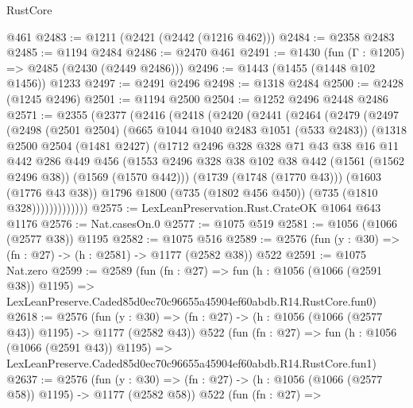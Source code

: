 \begin{lexlean}{RustCore}
\begin{coremodule}
    @461
@2483 := @1211 (@2421 (@2442 (@1216 @462)))
@2484 := @2358 @2483
@2485 := @1194 @2484
@2486 := @2470 @461
@2491 := @1430 (fun (Γ : @1205) => @2485 (@2430 (@2449 @2486)))
@2496 := @1443 (@1455 (@1448 @102 @1456)) @1233
@2497 := @2491 @2496
@2498 := @1318 @2484
@2500 := @2428 (@1245 @2496)
@2501 := @1194 @2500
@2504 := @1252 @2496 @2448 @2486
@2571 := @2355
    (@2377
      (@2416
        (@2418
          (@2420
            (@2441
              (@2464
                (@2479
                  (@2497
                    (@2498
                      (@2501 @2504)
                      (@665 @1044 @1040 @2483 @1051 (@533 @2483))
                      (@1318
                        @2500
                        @2504
                        (@1481 @2427)
                        (@1712
                          @2496
                          @328
                          @328
                          @71
                          @43
                          @38
                          @16
                          @11
                          @442
                          @286
                          @449
                          @456
                          (@1553
                            @2496
                            @328
                            @38
                            @102
                            @38
                            @442
                            (@1561 (@1562 @2496 @38))
                            (@1569 (@1570 @442)))
                          (@1739 (@1748 (@1770 @43)))
                          (@1603 (@1776 @43 @38))
                          @1796
                          @1800
                          (@735 (@1802 @456 @450))
                          (@735 (@1810 @328)))))))))))))
@2575 := LexLeanPreservation.Rust.CrateOK @1064 @643 @1176
@2576 := Nat.casesOn.{0}
@2577 := @1075 @519
@2581 := @1056 (@1066 (@2577 @38)) @1195
@2582 := @1075 @516
@2589 := @2576 (fun (y : @30) => (fn : @27) -> (h : @2581) -> @1177 (@2582 @38)) @522
@2591 := @1075 Nat.zero
@2599 := @2589
    (fun (fn : @27) =>
    fun (h : @1056 (@1066 (@2591 @38)) @1195) =>
    LexLeanPreserve.Caded85d0ec70c96655a45904ef60abdb.R14.RustCore.fun0)
@2618 := @2576
    (fun (y : @30) => (fn : @27) -> (h : @1056 (@1066 (@2577 @43)) @1195) -> @1177 (@2582 @43))
    @522
    (fun (fn : @27) =>
    fun (h : @1056 (@1066 (@2591 @43)) @1195) =>
    LexLeanPreserve.Caded85d0ec70c96655a45904ef60abdb.R14.RustCore.fun1)
@2637 := @2576
    (fun (y : @30) => (fn : @27) -> (h : @1056 (@1066 (@2577 @58)) @1195) -> @1177 (@2582 @58))
    @522
    (fun (fn : @27) =>

\end{coremodule}
\end{lexlean}
